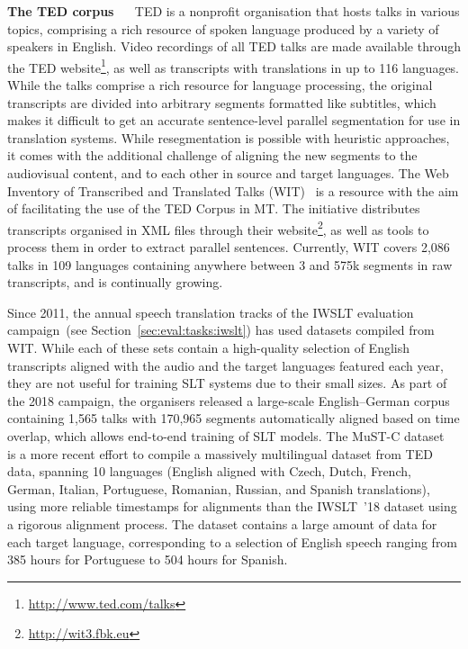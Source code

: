 \documentclass{svjour3}
\newcommand{\element}[1]{\noindent\textbf{#1} ~~}
\newcommand{\tedtrans}{IWSLT~’18}
\begin{document}
        \element{The TED corpus}
            TED is a nonprofit organisation that hosts talks in various topics, comprising a rich resource of spoken language produced by a variety of speakers in English. Video recordings of all TED talks are made available through the TED website\footnote{\url{http://www.ted.com/talks}}, as well as transcripts with translations in up to 116 languages. While the talks comprise a rich resource for language processing, the original transcripts are divided into arbitrary segments formatted like subtitles, which makes it difficult to get an accurate sentence-level parallel segmentation for use in translation systems. While resegmentation is possible with heuristic approaches, it comes with the additional challenge of aligning the new segments to the audiovisual content, and to each other in source and target languages.
The Web Inventory of Transcribed and Translated Talks (WIT)~\citep{cettolo-wit3:-2012} is a resource with the aim of facilitating the use of the TED Corpus in MT. The initiative distributes transcripts organised in XML files through their website\footnote{\url{http://wit3.fbk.eu}}, as well as tools to process them in order to extract parallel sentences. Currently, WIT covers 2,086 talks in 109 languages containing anywhere between 3 and 575k segments in raw transcripts, and is continually growing.
            
            Since 2011, the annual speech translation tracks of the IWSLT evaluation campaign~(see Section~\ref{sec:eval:tasks:iwslt}) has used datasets compiled from WIT. While each of these sets contain a high-quality selection of English transcripts aligned with the audio and the target languages featured each year, they are not useful for training SLT systems due to their small sizes. As part of the 2018 campaign, the organisers released a large-scale English--German corpus~\citep{niehues-iwslt-2018} containing 1,565 talks with 170,965 segments automatically aligned based on time overlap, which allows end-to-end training of SLT models. 
The MuST-C dataset~\citep{gangi-mustc-2019} is a more recent effort to compile a massively multilingual dataset from TED data, spanning 10 languages (English aligned with Czech, Dutch, French, German, Italian, Portuguese, Romanian, Russian, and Spanish translations), using more reliable timestamps for alignments than the \tedtrans{} dataset using a rigorous alignment process.
            The dataset contains a large amount of data for each target language, corresponding to a selection of English speech ranging from 385 hours for Portuguese to 504 hours for Spanish. \\
            
\end{document}
